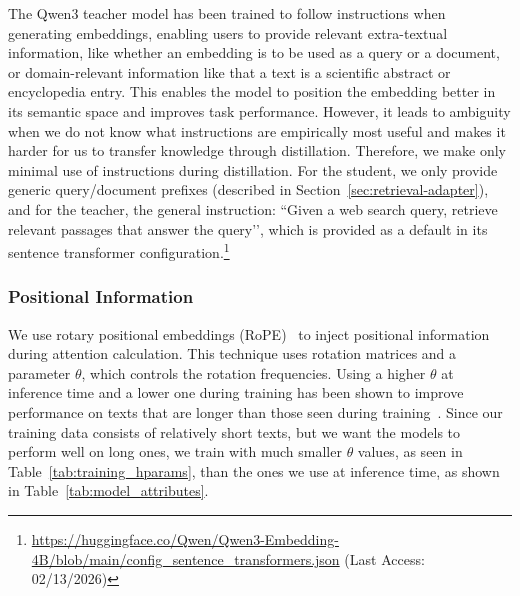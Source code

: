 \documentclass[11pt]{article}
\begin{document}
The Qwen3 teacher model has been trained to follow instructions when generating embeddings, enabling users to provide relevant extra-textual information, like whether an embedding is to be used as a query or a document, or domain-relevant information like that a text is a scientific abstract or encyclopedia entry.
This enables the model to position the embedding better in its semantic space and improves task performance. However, it leads to ambiguity when we do not know what instructions are empirically most useful and makes it harder for us to transfer knowledge through distillation.
Therefore, we make only minimal use of instructions during distillation.
For the student, we only provide generic query/document prefixes (described in Section~\ref{sec:retrieval-adapter}), and for the teacher, the general instruction: ``Given a web search query, retrieve relevant passages that answer the query’’, which is provided as a default in its sentence transformer configuration.\footnote{\url{https://huggingface.co/Qwen/Qwen3-Embedding-4B/blob/main/config_sentence_transformers.json} \tiny{(Last Access: 02/13/2026)}}


\subsubsection{Positional Information}
We use rotary positional embeddings (RoPE)~\cite{su2024roformer} to inject positional information during attention calculation.
This technique uses rotation matrices and a parameter $\theta$, which controls the rotation frequencies.
Using a higher $\theta$ at inference time and a lower one during training has been shown to improve performance on texts that are longer than those seen during training~\cite{zhang2024mgte, liu2024scaling}.
Since our training data consists of relatively short texts, but we want the models to perform well on long ones, we train with much smaller $\theta$ values, as seen in Table~\ref{tab:training_hparams}, than the ones we use at inference time, as shown in Table~\ref{tab:model_attributes}.

\end{document}
